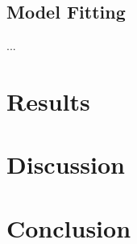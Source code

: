 \documentclass[12pt]{article}
\begin{document}
\subsection{Model Fitting}

...


\section{Results}

\section{Discussion}

\section{Conclusion}
\end{document}
